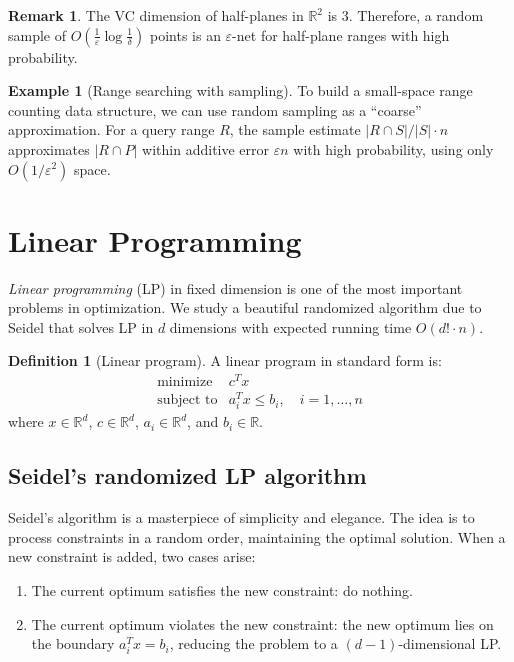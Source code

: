 \documentclass[twoside,12pt]{book}
\theoremstyle{plain}
\theoremstyle{definition}
\newtheorem{definition}[theorem]{Definition}
\newtheorem{example}[theorem]{Example}
\newtheorem{remark}[theorem]{Remark}
\theoremstyle{remark}
\begin{document}
\begin{remark}
The VC dimension of half-planes in $\mathbb{R}^2$ is 3. Therefore, a random sample of $O(\frac{1}{\varepsilon} \log \frac{1}{\delta})$ points is an $\varepsilon$-net for half-plane ranges with high probability.
\end{remark}

\begin{example}[Range searching with sampling]
To build a small-space range counting data structure, we can use random sampling as a ``coarse'' approximation. For a query range $R$, the sample estimate $|R \cap S| / |S| \cdot n$ approximates $|R \cap P|$ within additive error $\varepsilon n$ with high probability, using only $O(1/\varepsilon^2)$ space.
\end{example}

\section{Linear Programming}
\label{sec:lp}

\emph{Linear programming} (LP) in fixed dimension is one of the most important problems in optimization. We study a beautiful randomized algorithm due to Seidel that solves LP in $d$ dimensions with expected running time $O(d! \cdot n)$.

\begin{definition}[Linear program]
A linear program in standard form is:
\[
\begin{array}{ll}
\text{minimize} & c^T x \\
\text{subject to} & a_i^T x \leq b_i, \quad i = 1, \ldots, n
\end{array}
\]
where $x \in \mathbb{R}^d$, $c \in \mathbb{R}^d$, $a_i \in \mathbb{R}^d$, and $b_i \in \mathbb{R}$.
\end{definition}

\subsection{Seidel's randomized LP algorithm}

Seidel's algorithm is a masterpiece of simplicity and elegance. The idea is to process constraints in a random order, maintaining the optimal solution. When a new constraint is added, two cases arise:
\begin{enumerate}[nosep]
    \item The current optimum satisfies the new constraint: do nothing.
    \item The current optimum violates the new constraint: the new optimum lies on the boundary $a_i^T x = b_i$, reducing the problem to a $(d-1)$-dimensional LP.
\end{enumerate}
\end{document}
